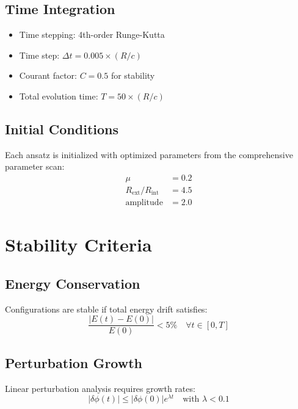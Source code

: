 \documentclass[11pt,a4paper]{article}
\begin{document}
\subsection{Time Integration}

\begin{itemize}
\item Time stepping: 4th-order Runge-Kutta
\item Time step: $\Delta t = 0.005 \times (R/c)$
\item Courant factor: $C = 0.5$ for stability
\item Total evolution time: $T = 50 \times (R/c)$
\end{itemize}

\subsection{Initial Conditions}

Each ansatz is initialized with optimized parameters from the comprehensive parameter scan:
\begin{align}
\mu &= 0.2 \\
R_{\text{ext}}/R_{\text{int}} &= 4.5 \\
\text{amplitude} &= 2.0
\end{align}

\section{Stability Criteria}

\subsection{Energy Conservation}

Configurations are stable if total energy drift satisfies:
\begin{equation}
\frac{|E(t) - E(0)|}{E(0)} < 5\% \quad \forall t \in [0, T]
\end{equation}

\subsection{Perturbation Growth}

Linear perturbation analysis requires growth rates:
\begin{equation}
|\delta\phi(t)| \leq |\delta\phi(0)| e^{\lambda t} \quad \text{with } \lambda < 0.1
\end{equation}
\end{document}
